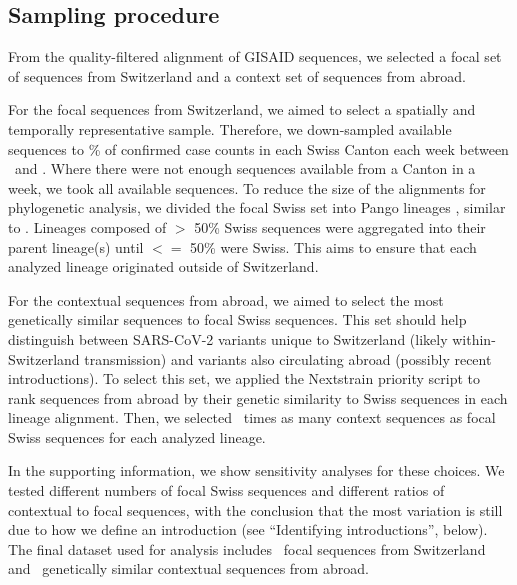 \documentclass[11pt,twoside,lineno]{pnas-new} %
\newcommand{\maxsamplingpercent}{\maxsamplingfraction*100}
\begin{document}
\subsection*{Sampling procedure}

From the quality-filtered alignment of GISAID sequences, we selected a focal set of sequences from Switzerland and a context set of sequences from abroad. 

For the focal sequences from Switzerland, we aimed to select a spatially and temporally representative sample. Therefore, we down-sampled available sequences to \fpeval{\maxsamplingpercent}\% of confirmed case counts in each Swiss Canton each week between \mindate\ and \maxdate. Where there were not enough sequences available from a Canton in a week, we took all available sequences. To reduce the size of the alignments for phylogenetic analysis, we divided the focal Swiss set into Pango lineages \cite{Rambaut}, similar to \cite{DuPlessis2021}. Lineages composed of $>$ 50\% Swiss sequences were aggregated into their parent lineage(s) until $<=$ 50\% were Swiss. This aims to ensure that each analyzed lineage originated outside of Switzerland.

For the contextual sequences from abroad, we aimed to select the most genetically similar sequences to focal Swiss sequences. This set should help distinguish between SARS-CoV-2 variants unique to Switzerland (likely within-Switzerland transmission) and variants also circulating abroad (possibly recent introductions). To select this set, we applied the Nextstrain priority script \cite{Nextstrainteam} to rank sequences from abroad by their genetic similarity to Swiss sequences in each lineage alignment. Then, we selected \similaritycontextscalefactor\ times as many  context sequences as focal Swiss sequences for each analyzed lineage. 

In the supporting information, we show sensitivity analyses for these choices. We tested different numbers of focal Swiss sequences and different ratios of contextual to focal sequences, with the conclusion that the most variation is still due to how we define an introduction (see ``Identifying introductions'', below). The final dataset used for analysis includes \nfocalsamples\ focal sequences from Switzerland and \nsimcontext\ genetically similar contextual sequences from abroad.
\end{document}
